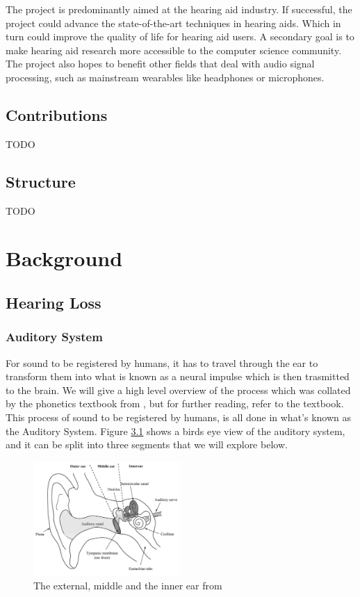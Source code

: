 \documentclass[logo,bsc,singlespacing,parskip,online]{infthesis}
\begin{document}
The project is predominantly aimed at the hearing aid industry. If successful, the project
could advance the state-of-the-art techniques in hearing aids.
Which in turn could improve the quality of life for hearing aid users.
A secondary goal is to make hearing aid research more accessible to the 
computer science community.
The project also hopes to benefit other fields that deal with audio signal processing,
such as mainstream wearables like headphones or microphones.

\section{Contributions}
TODO

\section{Structure}
TODO

\chapter{Background}

\section{Hearing Loss}
\subsection{Auditory System}
For sound to be registered by humans, it has to travel through the ear to transform them into
what is known as a neural impulse which is then trasmitted to the brain. We will 
give a high level overview of the process which was collated by the phonetics textbook from \citet{Wayland2018Phonetics},
 but for further reading, refer to the textbook. 
 This process of sound to be registered by humans, is all done in what's known as the Auditory System.
 Figure \ref{fig:ear} shows a birds eye view of the auditory system, and it can be split into three segments
 that we will explore below.

\begin{figure}[h]
   \centering
   \includegraphics[width=0.5\textwidth]{wayland-ear}
   \caption{The external, middle and the inner ear from \citet{Wayland2018Phonetics}}
   \label{fig:ear}
\end{figure}
\end{document}

